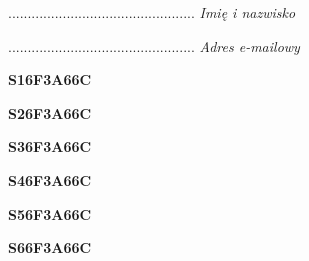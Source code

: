 \begin{turn}{90}\begin{minipage}{\linewidth} \vspace{20mm} ................................................  \textit{Imię i nazwisko}\end{minipage}\end{turn}

\begin{turn}{90}\begin{minipage}{\linewidth} \vspace{20mm} ................................................  \textit{Adres e-mailowy}\end{minipage}\end{turn}

\begin{turn}{90}\huge \begin{minipage}{\linewidth} \vspace{10mm}\textbf{S16F3A66C}\end{minipage}\end{turn}

\begin{turn}{90}\huge \begin{minipage}{\linewidth} \vspace{10mm}\textbf{S26F3A66C}\end{minipage}\end{turn}

\begin{turn}{90}\huge \begin{minipage}{\linewidth} \vspace{10mm}\textbf{S36F3A66C}\end{minipage}\end{turn}

\begin{turn}{90}\huge \begin{minipage}{\linewidth} \vspace{10mm}\textbf{S46F3A66C}\end{minipage}\end{turn}

\begin{turn}{90}\huge \begin{minipage}{\linewidth} \vspace{10mm}\textbf{S56F3A66C}\end{minipage}\end{turn}

\begin{turn}{90}\huge \begin{minipage}{\linewidth} \vspace{10mm}\textbf{S66F3A66C}\end{minipage}\end{turn}

